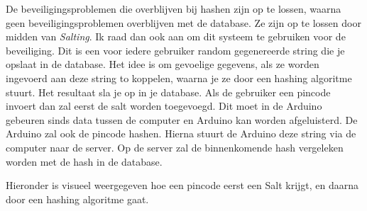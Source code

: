 \documentclass{article}
\begin{document}
De beveiligingsproblemen die overblijven bij hashen zijn op te lossen, waarna geen beveiligingsproblemen overblijven met de database.
Ze zijn op te lossen door midden van \emph{Salting}.
Ik raad dan ook aan om dit systeem te gebruiken voor de beveiliging.
Dit is een voor iedere gebruiker random gegenereerde string die je opslaat in de database.
Het idee is om gevoelige gegevens, als ze worden ingevoerd aan deze string to koppelen, waarna je ze door een hashing algoritme stuurt.
Het resultaat sla je op in je database.
Als de gebruiker een pincode invoert dan zal eerst de salt worden toegevoegd.
Dit moet in de Arduino gebeuren sinds data tussen de computer en Arduino kan worden afgeluisterd.
De Arduino zal ook de pincode hashen.
Hierna stuurt de Arduino deze string via de computer naar de server.
Op de server zal de binnenkomende hash vergeleken worden met de hash in de database.

Hieronder is visueel weergegeven hoe een pincode eerst een Salt krijgt, en daarna door een hashing algoritme gaat.

\hfill

\centerline{  }
\end{document}
